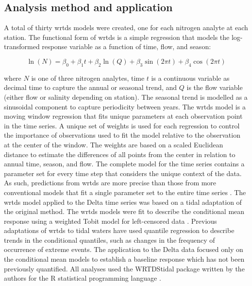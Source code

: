 \documentclass[journal = esthag, manuscript = article]{achemso}\usepackage[]{graphicx}\usepackage[]{color}
\begin{document}
\subsection{Analysis method and application}

A total of thirty \ac{wrtds} models were created, one for each nitrogen analyte at each station.  The functional form of \ac{wrtds} is a simple regression\cite{Hirsch10} that models the log-transformed response variable as a function of time, flow, and season:

\begin{equation}
\ln\left(N\right) = \beta_0 + \beta_1 t + \beta_2 \ln\left(Q\right) + \beta_3 \sin\left(2\pi t\right) + \beta_4 \cos\left(2\pi t\right)
\end{equation}  

\noindent where $N$ is one of three nitrogen analytes, time $t$ is a continuous variable as decimal time to capture the annual or seasonal trend, and $Q$ is the flow variable (either flow or salinity depending on station).  The seasonal trend is modelled as a sinusoidal component to capture periodicity between years.  The \ac{wrtds} model is a moving window regression that fits unique parameters at each observation point in the time series.  A unique set of weights is used for each regression to control the importance of observations used to fit the model relative to the observation at the center of the window. The weights are based on a scaled Euclidean distance to estimate the differences of all points from the center in relation to annual time, season, and flow. The complete model for the time series contains a parameter set for every time step that considers the unique context of the data.  As such, predictions from \ac{wrtds} are more precise than those from more conventional models that fit a single parameter set to the entire time series \cite{Moyer12,Beck15}.  The \ac{wrtds} model applied to the Delta time series was based on a tidal adaptation of the original method\cite{Beck15}.  The \ac{wrtds} models were fit to describe the conditional mean response using a weighted Tobit model for left-censored data \cite{Tobin58}.  Previous adaptations of \ac{wrtds} to tidal waters have used quantile regression to describe trends in the conditional quantiles, such as changes in the frequency of occurrence of extreme events.  The application to the Delta data focused only on the conditional mean models to establish a baseline response which has not been previously quantified.  All analyses used the WRTDStidal package written by the authors for the R statistical programming language \cite{Beck16b,RDCT16}.
\end{document}
